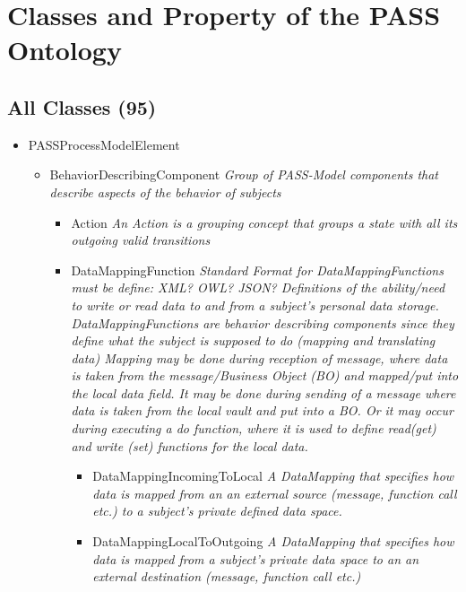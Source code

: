 \chapter{Classes and Property of the PASS Ontology}


\section{All Classes (95)}

\begin{itemize}
\item PASSProcessModelElement
\begin{itemize}
	\item BehaviorDescribingComponent \linebreak \textit{Group of PASS-Model components that describe aspects of the behavior of subjects}
	\begin{itemize}
		\item Action \linebreak \textit{An Action is a grouping concept that groups a state with all its outgoing valid transitions}
		\item DataMappingFunction \linebreak \textit{Standard Format for DataMappingFunctions must be define: XML? OWL? JSON? 
		Definitions of the ability/need to write or read data to and from a subject's personal data storage.
		DataMappingFunctions are behavior describing components since they define what the subject is supposed to do (mapping and translating data)
		Mapping may be done during reception of message, where data is taken from the message/Business Object (BO) and mapped/put into the local data field.
		It may be done during sending of a message where data is taken from the local vault and put into a BO.
		Or it may occur during executing a do function, where it is used to define read(get) and write (set) functions for the local data.}
		\begin{itemize}
			\item DataMappingIncomingToLocal \linebreak \textit{A DataMapping that specifies how data is mapped from an an external source (message, function call etc.) to a subject's private defined data space.}
			\item DataMappingLocalToOutgoing \linebreak \textit{A DataMapping that specifies how data is mapped from a subject's private data space to an an external destination (message, function call etc.)}

\end{itemize}
\end{itemize}
\end{itemize}
\end{itemize}
